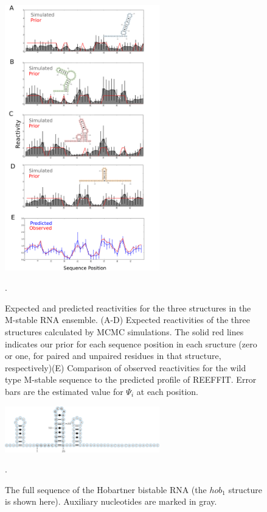 \documentclass[12pt]{article}
\begin{document}
\begin{figure}[here]
\includegraphics[width=0.6\textwidth]{figures/mstablepredicted.png}
\caption{Expected and predicted reactivities for the three structures in the M-stable RNA ensemble. (A-D) Expected reactivities of the three structures calculated by MCMC simulations. The solid red lines indicates our prior for each sequence position in each sructure (zero or one, for paired and unpaired residues in that structure, respectively)(E)  Comparison of observed reactivities for the wild type M-stable sequence to the predicted profile of REEFFIT. Error bars are the estimated value for $\Psi_i$ at each position.}.
\label{fig:mstableredictedfig}
\end{figure}

\begin{figure}[here]
\includegraphics[width=0.6\textwidth]{figures/hobartnerseq.png}
\caption{The full sequence of the Hobartner bistable RNA (the $hob_1$ structure is shown here). Auxiliary nucleotides are marked in gray.}.
\label{fig:hobartnerseq}
\end{figure}
\end{document}
